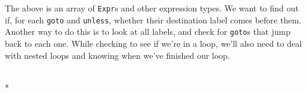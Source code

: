 \documentclass[letterpaper,10pt,english]{/usr/share/sphinx/texinputs/sphinxhowto}
\def\smaller{\fontsize{9.5pt}{9.5pt}\selectfont}
\begin{document}
        
    
The above is an array of \texttt{Expr}s and other expression types. We
want to find out if, for each \texttt{goto} and \texttt{unless}, whether
their destination label comes before them. Another way to do this is to
look at all labels, and check for \texttt{goto}s that jump back to each
one. While checking to see if we're in a loop, we'll also need to deal
with nested loops and knowing when we've finished our loop.


    
        \vspace{6pt}
        \makebox[0.1\linewidth]{\smaller\hfill\tt\color{nbframe-in-prompt}In\hspace{4pt}{[}44{]}:\hspace{4pt}}\\*
        \vspace{-2.65\baselineskip}
\end{document}
